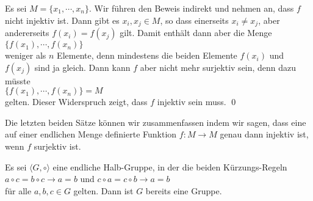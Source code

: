\proof
Es sei $M = \{x_1, \cdots, x_n \}$.  Wir f\"{u}hren den Beweis indirekt und nehmen an, dass $f$ nicht injektiv
ist.  Dann gibt es $x_i, x_j \in M$, so dass einerseits $x_i \not= x_j$, aber andererseits $f(x_i) =
f(x_j)$ gilt.  
Damit enth\"{a}lt dann aber die Menge
\\[0.2cm]
\hspace*{1.3cm}
$\{ f(x_1), \cdots, f(x_n) \}$
\\[0.2cm]
weniger als $n$ Elemente, denn mindestens die beiden Elemente $f(x_i)$ und $f(x_j)$ sind ja gleich.
Dann kann $f$ aber nicht mehr surjektiv sein, denn dazu m\"{u}sste 
\\[0.2cm]
\hspace*{1.3cm}
$\{ f(x_1), \cdots, f(x_n) \} = M$
\\[0.2cm] 
gelten.  Dieser Widerspruch zeigt, dass $f$ injektiv sein muss.
\qed

\remark
Die letzten beiden S\"{a}tze k\"{o}nnen wir zusammenfassen indem wir sagen, dass eine auf einer endlichen
Menge definierte Funktion $f:M \rightarrow M$ genau dann injektiv ist, wenn $f$ surjektiv ist.
\eox

\begin{Satz}
  Es sei $\langle G, \circ \rangle$ eine endliche Halb-Gruppe, in der die beiden K\"{u}rzungs-Regeln
  \\[0.2cm]
  \hspace*{1.3cm}
  $a \circ c = b \circ c \rightarrow a = b$ \quad und \quad
  $c \circ a = c \circ b \rightarrow a = b$
  \\[0.2cm]
  f\"{u}r alle $a,b,c \in G$ gelten.  Dann ist $G$ bereits eine Gruppe.
\end{Satz}

